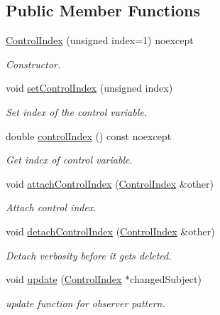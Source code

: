 \subsection*{Public Member Functions}
\begin{DoxyCompactItemize}
\item 
\hyperlink{classSpacy_1_1Mixin_1_1ControlIndex_afa09ff1cc2b7476e8b6e7e26e71cd775_afa09ff1cc2b7476e8b6e7e26e71cd775}{Control\+Index} (unsigned index=1) noexcept
\begin{DoxyCompactList}\small\item\em Constructor. \end{DoxyCompactList}\item 
void \hyperlink{classSpacy_1_1Mixin_1_1ControlIndex_a4e6c305c148d81f15638fc214f60ed00_a4e6c305c148d81f15638fc214f60ed00}{set\+Control\+Index} (unsigned index)
\begin{DoxyCompactList}\small\item\em Set index of the control variable. \end{DoxyCompactList}\item 
double \hyperlink{classSpacy_1_1Mixin_1_1ControlIndex_a04fd74c67e320942ff6513fe0a741913_a04fd74c67e320942ff6513fe0a741913}{control\+Index} () const noexcept
\begin{DoxyCompactList}\small\item\em Get index of control variable. \end{DoxyCompactList}\item 
void \hyperlink{classSpacy_1_1Mixin_1_1ControlIndex_a31b734645d51290cb4db6798018ab232_a31b734645d51290cb4db6798018ab232}{attach\+Control\+Index} (\hyperlink{classSpacy_1_1Mixin_1_1ControlIndex}{Control\+Index} \&other)
\begin{DoxyCompactList}\small\item\em Attach control index. \end{DoxyCompactList}\item 
\hypertarget{classSpacy_1_1Mixin_1_1ControlIndex_a3b39990dd9cf45d046966fb026c4a9ee}{}void \hyperlink{classSpacy_1_1Mixin_1_1ControlIndex_a3b39990dd9cf45d046966fb026c4a9ee}{detach\+Control\+Index} (\hyperlink{classSpacy_1_1Mixin_1_1ControlIndex}{Control\+Index} \&other)\label{classSpacy_1_1Mixin_1_1ControlIndex_a3b39990dd9cf45d046966fb026c4a9ee}

\begin{DoxyCompactList}\small\item\em Detach verbosity before it gets deleted. \end{DoxyCompactList}\item 
\hypertarget{classSpacy_1_1Mixin_1_1ControlIndex_aa534a05629e88a5cc479f161139cf3f7}{}void \hyperlink{classSpacy_1_1Mixin_1_1ControlIndex_aa534a05629e88a5cc479f161139cf3f7}{update} (\hyperlink{classSpacy_1_1Mixin_1_1ControlIndex}{Control\+Index} $\ast$changed\+Subject)\label{classSpacy_1_1Mixin_1_1ControlIndex_aa534a05629e88a5cc479f161139cf3f7}

\begin{DoxyCompactList}\small\item\em update function for observer pattern. \end{DoxyCompactList}\end{DoxyCompactItemize}
